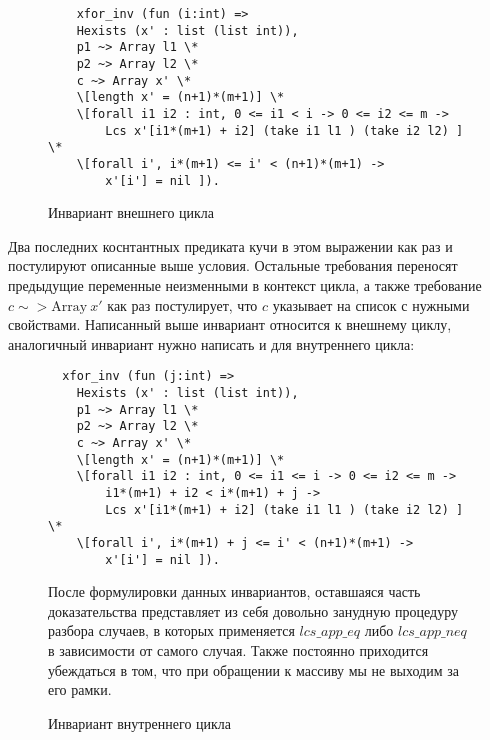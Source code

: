 \begin{figure}[H]
  \caption{Инвариант внешнего цикла}
  \label{code:outer_cycle_inv}
  \begin{verbatim}
    xfor_inv (fun (i:int) => 
    Hexists (x' : list (list int)),
    p1 ~> Array l1 \*
    p2 ~> Array l2 \*
    c ~> Array x' \*
    \[length x' = (n+1)*(m+1)] \*
    \[forall i1 i2 : int, 0 <= i1 < i -> 0 <= i2 <= m -> 
        Lcs x'[i1*(m+1) + i2] (take i1 l1 ) (take i2 l2) ] \* 
    \[forall i', i*(m+1) <= i' < (n+1)*(m+1) ->
        x'[i'] = nil ]). 
  \end{verbatim}
\end{figure}

Два последних коснтантных предиката кучи в этом выражении как раз и постулируют описанные выше условия. Остальные требования переносят
предыдущие переменные неизменными в контекст цикла, а также требование $c \sim> \text{Array}\ x'$  как раз постулирует, что $c$ указывает на
список с нужными свойствами. Написанный выше инвариант относится к внешнему циклу, аналогичный инвариант нужно написать и для внутреннего цикла:

\begin{figure}[H]
  \caption{Инвариант внутреннего цикла}
  \label{code:inner_cycle_inv}
  \begin{verbatim}
  xfor_inv (fun (j:int) => 
    Hexists (x' : list (list int)),
    p1 ~> Array l1 \*
    p2 ~> Array l2 \*
    c ~> Array x' \*
    \[length x' = (n+1)*(m+1)] \*
    \[forall i1 i2 : int, 0 <= i1 <= i -> 0 <= i2 <= m -> 
        i1*(m+1) + i2 < i*(m+1) + j -> 
        Lcs x'[i1*(m+1) + i2] (take i1 l1 ) (take i2 l2) ] \*
    \[forall i', i*(m+1) + j <= i' < (n+1)*(m+1) ->
        x'[i'] = nil ]). 
  \end{verbatim}

  После формулировки данных инвариантов, оставшаяся часть доказательства представляет из себя довольно занудную процедуру
  разбора случаев, в которых применяется $lcs\_app\_eq$ либо $lcs\_app\_neq$ в зависимости от самого случая. Также постоянно приходится
  убеждаться в том, что при обращении к массиву мы не выходим за его рамки.
\end{figure}